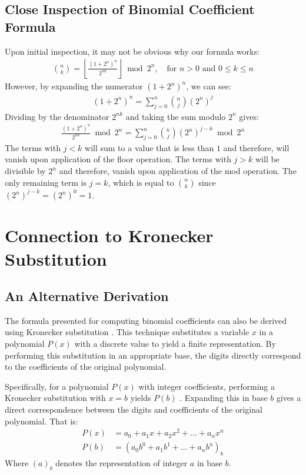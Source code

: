 \documentclass{article}
\theoremstyle{plain}
\theoremstyle{definition}
\begin{document}
\subsection{Close Inspection of Binomial Coefficient Formula}
Upon initial inspection, it may not be obvious why our formula works:
\begin{align*}
    \binom{n}{k} = \left\lfloor\frac{(1 + 2^{n})^{n}}{2^{n k}}\right\rfloor \bmod{2^{n}}, \quad \text{for } n > 0 \text{ and } 0 \leq k \leq n
\end{align*}
However, by expanding the numerator $(1 + 2^{n})^{n}$, we can see:
\begin{align}
    (1 + 2^{n})^{n} = \sum_{j=0}^{n} \binom{n}{j} (2^n)^{j}
\end{align}
Dividing by the denominator $2^{n k}$ and taking the sum modulo $2^n$ gives:
\begin{align}
    \frac{(1 + 2^{n})^{n}}{2^{n k}} \bmod{2^n} = \sum_{j=0}^{n} \binom{n}{j} (2^n)^{j-k} \bmod{2^n}
\end{align}
The terms with $j < k$ will sum to a value that is less than $1$ and therefore, will vanish upon application of the floor operation. The terms with $j > k$ will be divisible by $2^n$ and therefore, vanish upon application of the mod operation. The only remaining term is $j = k$, which is equal to $\binom{n}{k}$ since $(2^n)^{j-k} = (2^n)^0 = 1$.

\section{Connection to Kronecker Substitution}
\label{sec:kronecker}

\subsection{An Alternative Derivation}
The formula presented for computing binomial coefficients can also be derived using Kronecker substitution \cite{grimaldi2004discrete}. This technique substitutes a variable $x$ in a polynomial $P(x)$ with a discrete value to yield a finite representation. By performing this substitution in an appropriate base, the digits directly correspond to the coefficients of the original polynomial.

Specifically, for a polynomial $P(x)$ with integer coefficients, performing a Kronecker substitution with $x = b$ yields $P(b)$ \cite{grimaldi2004discrete}. Expanding this in base $b$ gives a direct correspondence between the digits and coefficients of the original polynomial. That is:
\begin{align}
    P(x) &= a_0 + a_1 x + a_2 x^2 + \ldots + a_n x^n \\
    P(b) &= (a_0 b^0 + a_1 b^1 + \ldots + a_n b^n)_b
\end{align}
Where $(a)_b$ denotes the representation of integer $a$ in base $b$.
\end{document}
